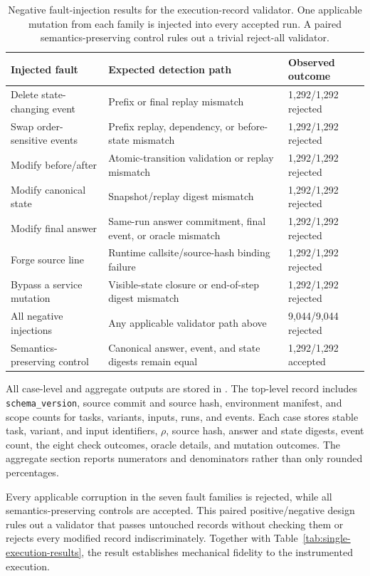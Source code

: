 \documentclass[letterpaper]{article}
\begin{document}
\begin{table}[t]
\centering
\small
\begin{tabular}{@{}p{}p{}p{}@{}}
\toprule
Injected fault & Expected detection path & Observed outcome \\
\midrule
Delete state-changing event & Prefix or final replay mismatch & 1,292/1,292 rejected \\
Swap order-sensitive events & Prefix replay, dependency, or before-state mismatch & 1,292/1,292 rejected \\
Modify before/after & Atomic-transition validation or replay mismatch & 1,292/1,292 rejected \\
Modify canonical state & Snapshot/replay digest mismatch & 1,292/1,292 rejected \\
Modify final answer & Same-run answer commitment, final event, or oracle mismatch & 1,292/1,292 rejected \\
Forge source line & Runtime callsite/source-hash binding failure & 1,292/1,292 rejected \\
Bypass a service mutation & Visible-state closure or end-of-step digest mismatch & 1,292/1,292 rejected \\
\midrule
All negative injections & Any applicable validator path above & 9,044/9,044 rejected \\
Semantics-preserving control & Canonical answer, event, and state digests remain equal & 1,292/1,292 accepted \\
\bottomrule
\end{tabular}
\caption{Negative fault-injection results for the execution-record validator. One applicable mutation from each family is injected into every accepted run. A paired semantics-preserving control rules out a trivial reject-all validator.}
\label{tab:single-execution-mutations}
\end{table}

All case-level and aggregate outputs are stored in
. The top-level record includes
\texttt{schema\_version}, source commit and source hash, environment
manifest, and scope counts for tasks, variants, inputs, runs, and
events. Each case stores stable task, variant, and input identifiers,
$\rho$, source hash, answer and state digests, event count, the eight
check outcomes, oracle details, and mutation outcomes. The aggregate
section reports numerators and denominators rather than only rounded
percentages.

Every applicable corruption in the seven fault families is rejected,
while all semantics-preserving controls are accepted. This paired
positive/negative design rules out a validator that passes untouched
records without checking them or rejects every modified record
indiscriminately. Together with Table~\ref{tab:single-execution-results},
the result establishes mechanical fidelity to the instrumented
execution.
\end{document}
